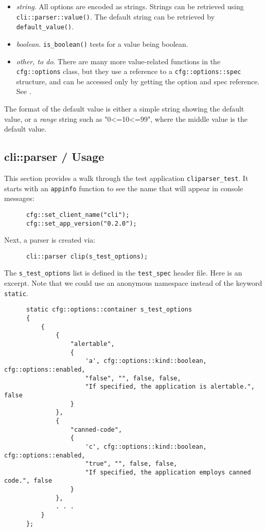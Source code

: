    \begin{itemize}
      \item \textsl{string}.
         All options are encoded as strings.
         Strings can be retrieved using \texttt{cli::parser::value()}.
         The default string can be retrieved by \texttt{default\_value()}.
      \item \textsl{boolean}.
         \texttt{is\_boolean()} tests for a value being boolean.
      \item \textsl{other, to do}.
         There are many more value-related functions in the
         \texttt{cfg::options} class, but they use a reference to
         a \texttt{cfg::options::spec} structure, and can be accessed
         only by getting the option and spec reference.
         See .
   \end{itemize}

   The format of the default value is either a simple string showing the
   default value, or a \textsl{range} string such as "0<=10<=99", where
   the middle value is the default value.

\subsection{cli::parser / Usage}
\label{subsec:cli_namespace_parser_usage}

   This section provides a walk through the test application
   \texttt{cliparser\_test}. It starts with an \texttt{appinfo} function
   to see the name that will appear in console messages:

   \begin{verbatim}
      cfg::set_client_name("cli");
      cfg::set_app_version("0.2.0");
   \end{verbatim}

   Next, a parser is created via:

   \begin{verbatim}
      cli::parser clip(s_test_options);
   \end{verbatim}

   The \texttt{s\_test\_options} list is defined in the \texttt{test\_spec}
   header file. Here is an excerpt. Note that we could use an anonymous
   namespace instead of the keyword \texttt{static}.

   \begin{verbatim}
      static cfg::options::container s_test_options
      {
          {
              {
                  "alertable",
                  {
                      'a', cfg::options::kind::boolean, cfg::options::enabled,
                      "false", "", false, false,
                      "If specified, the application is alertable.", false
                  }
              },
              {
                  "canned-code",
                  {
                      'c', cfg::options::kind::boolean, cfg::options::enabled,
                      "true", "", false, false,
                      "If specified, the application employs canned code.", false
                  }
              },
              . . .
          }
      };
   \end{verbatim}

